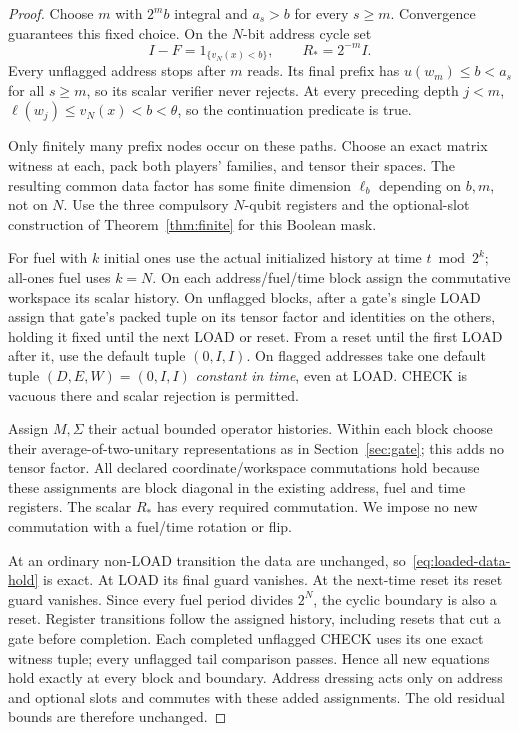 \begin{proof}
Choose $m$ with $2^mb$ integral and $a_s>b$ for every $s\ge m$. Convergence guarantees this fixed choice. On the $N$-bit address cycle set
\[
 I-F=1_{\{v_N(x)<b\}},\qquad R_*=2^{-m}I.
\]
Every unflagged address stops after $m$ reads. Its final prefix has $u(w_m)\le b<a_s$ for all $s\ge m$, so its scalar verifier never rejects. At every preceding depth $j<m$, $\ell(w_j)\le v_N(x)<b<\theta$, so the continuation predicate is true.

Only finitely many prefix nodes occur on these paths. Choose an exact matrix witness at each, pack both players' families, and tensor their spaces. The resulting common data factor has some finite dimension $\ell_b$ depending on $b,m$, not on $N$. Use the three compulsory $N$-qubit registers and the optional-slot construction of Theorem~\ref{thm:finite} for this Boolean mask.

For fuel with $k$ initial ones use the actual initialized history at time $t\bmod2^k$; all-ones fuel uses $k=N$. On each address/fuel/time block assign the commutative workspace its scalar history. On unflagged blocks, after a gate's single LOAD assign that gate's packed tuple on its tensor factor and identities on the others, holding it fixed until the next LOAD or reset. From a reset until the first LOAD after it, use the default tuple $(0,I,I)$. On flagged addresses take one default tuple $(D,E,W)=(0,I,I)$ \emph{constant in time}, even at LOAD. CHECK is vacuous there and scalar rejection is permitted.

Assign $M,\Sigma$ their actual bounded operator histories. Within each block choose their average-of-two-unitary representations as in Section~\ref{sec:gate}; this adds no tensor factor. All declared coordinate/workspace commutations hold because these assignments are block diagonal in the existing address, fuel and time registers. The scalar $R_*$ has every required commutation. We impose no new commutation with a fuel/time rotation or flip.

At an ordinary non-LOAD transition the data are unchanged, so~\eqref{eq:loaded-data-hold} is exact. At LOAD its final guard vanishes. At the next-time reset its reset guard vanishes. Since every fuel period divides $2^N$, the cyclic boundary is also a reset. Register transitions follow the assigned history, including resets that cut a gate before completion. Each completed unflagged CHECK uses its one exact witness tuple; every unflagged tail comparison passes. Hence all new equations hold exactly at every block and boundary. Address dressing acts only on address and optional slots and commutes with these added assignments. The old residual bounds are therefore unchanged.


\end{proof}
